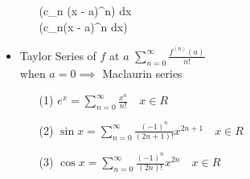 \begin{itemize}
\begin{itemize}
\int \sum (c_n (x - a)^n) dx\\
\sum (\int c_n(x - a)^n dx)\)
\end{itemize}
\item Taylor Series of \(f\) at \(a\)
\(\displaystyle \sum^{\infty}_{n = 0} \frac{f^{(n)}(a)}{n!}\)\\
when \(a = 0 \implies\) Maclaurin series 
\begin{itemize}
\item[(1)] \(\displaystyle e^x = \sum^{\infty}_{n = 0} \frac{x^n}{n!} \quad x \in R\)
\item[(2)] \(\displaystyle \sin x  = \sum^{\infty}_{n = 0} \frac{(-1)^n}{(2n + 1)!}x^{2n + 1} \quad x \in R\)
\item[(3)] \(\displaystyle \cos x = \sum^{\infty}_{n = 0} \frac{(-1)^n}{(2n)!} x^{2n} \quad x \in R\)
\end{itemize}
\end{itemize}